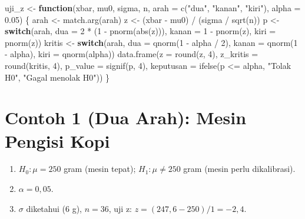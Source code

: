\documentclass[
  indonesian,
  letterpaper,
]{book}
\newenvironment{Shaded}{\begin{snugshade}}{\end{snugshade}}
\newcommand{\AttributeTok}[1]{\textcolor[rgb]{0.40,0.45,0.13}{#1}}
\newcommand{\ControlFlowTok}[1]{\textcolor[rgb]{0.00,0.23,0.31}{\textbf{#1}}}
\newcommand{\DecValTok}[1]{\textcolor[rgb]{0.68,0.00,0.00}{#1}}
\newcommand{\FloatTok}[1]{\textcolor[rgb]{0.68,0.00,0.00}{#1}}
\newcommand{\FunctionTok}[1]{\textcolor[rgb]{0.28,0.35,0.67}{#1}}
\newcommand{\NormalTok}[1]{\textcolor[rgb]{0.00,0.23,0.31}{#1}}
\newcommand{\OtherTok}[1]{\textcolor[rgb]{0.00,0.23,0.31}{#1}}
\newcommand{\SpecialCharTok}[1]{\textcolor[rgb]{0.37,0.37,0.37}{#1}}
\newcommand{\StringTok}[1]{\textcolor[rgb]{0.13,0.47,0.30}{#1}}
\providecommand{\tightlist}{%
  \setlength{\itemsep}{0pt}\setlength{\parskip}{0pt}}
\begin{document}
\begin{Shaded}
\begin{Highlighting}[]
\NormalTok{uji\_z }\OtherTok{\textless{}{-}} \ControlFlowTok{function}\NormalTok{(xbar, mu0, sigma, n, }\AttributeTok{arah =} \FunctionTok{c}\NormalTok{(}\StringTok{"dua"}\NormalTok{, }\StringTok{"kanan"}\NormalTok{, }\StringTok{"kiri"}\NormalTok{), }\AttributeTok{alpha =} \FloatTok{0.05}\NormalTok{) \{}
\NormalTok{  arah }\OtherTok{\textless{}{-}} \FunctionTok{match.arg}\NormalTok{(arah)}
\NormalTok{  z }\OtherTok{\textless{}{-}}\NormalTok{ (xbar }\SpecialCharTok{{-}}\NormalTok{ mu0) }\SpecialCharTok{/}\NormalTok{ (sigma }\SpecialCharTok{/} \FunctionTok{sqrt}\NormalTok{(n))}
\NormalTok{  p }\OtherTok{\textless{}{-}} \ControlFlowTok{switch}\NormalTok{(arah, }\AttributeTok{dua =} \DecValTok{2} \SpecialCharTok{*}\NormalTok{ (}\DecValTok{1} \SpecialCharTok{{-}} \FunctionTok{pnorm}\NormalTok{(}\FunctionTok{abs}\NormalTok{(z))), }\AttributeTok{kanan =} \DecValTok{1} \SpecialCharTok{{-}} \FunctionTok{pnorm}\NormalTok{(z), }\AttributeTok{kiri =} \FunctionTok{pnorm}\NormalTok{(z))}
\NormalTok{  kritis }\OtherTok{\textless{}{-}} \ControlFlowTok{switch}\NormalTok{(arah, }\AttributeTok{dua =} \FunctionTok{qnorm}\NormalTok{(}\DecValTok{1} \SpecialCharTok{{-}}\NormalTok{ alpha }\SpecialCharTok{/} \DecValTok{2}\NormalTok{), }\AttributeTok{kanan =} \FunctionTok{qnorm}\NormalTok{(}\DecValTok{1} \SpecialCharTok{{-}}\NormalTok{ alpha), }\AttributeTok{kiri =} \FunctionTok{qnorm}\NormalTok{(alpha))}
  \FunctionTok{data.frame}\NormalTok{(}\AttributeTok{z =} \FunctionTok{round}\NormalTok{(z, }\DecValTok{4}\NormalTok{), }\AttributeTok{z\_kritis =} \FunctionTok{round}\NormalTok{(kritis, }\DecValTok{4}\NormalTok{), }\AttributeTok{p\_value =} \FunctionTok{signif}\NormalTok{(p, }\DecValTok{4}\NormalTok{),}
             \AttributeTok{keputusan =} \FunctionTok{ifelse}\NormalTok{(p }\SpecialCharTok{\textless{}=}\NormalTok{ alpha, }\StringTok{"Tolak H0"}\NormalTok{, }\StringTok{"Gagal menolak H0"}\NormalTok{))}
\NormalTok{\}}
\end{Highlighting}
\end{Shaded}

\section{Contoh 1 (Dua Arah): Mesin Pengisi
Kopi}\label{contoh-1-dua-arah-mesin-pengisi-kopi}

\begin{enumerate}
\def\labelenumi{\arabic{enumi}.}
\tightlist
\item
  \(H_0 : \mu = 250\) gram (mesin tepat); \(H_1 : \mu \neq 250\) gram
  (mesin perlu dikalibrasi).
\item
  \(\alpha = 0{,}05\).
\item
  \(\sigma\) diketahui (6 g), \(n = 36\), uji z:
  \(z = (247{,}6 - 250)/1 = -2{,}4\).
\end{enumerate}
\end{document}
